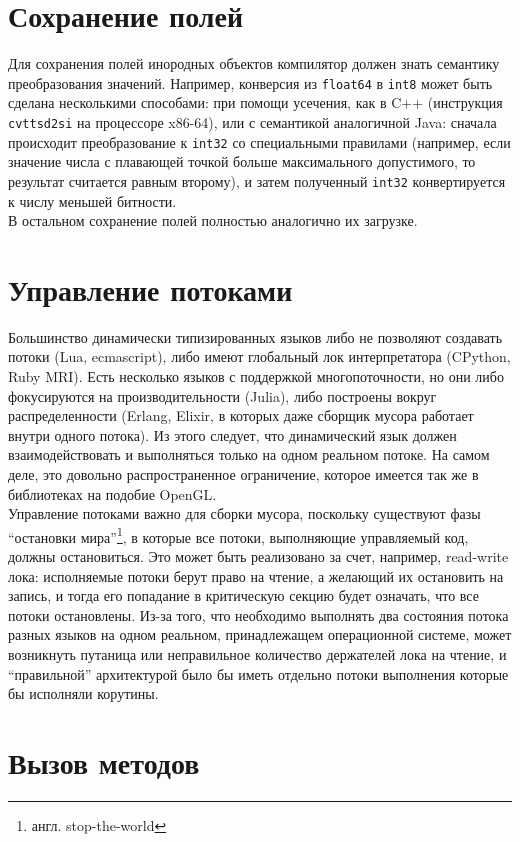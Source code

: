 \documentclass[times,specification,annotation]{itmo-student-thesis}
\begin{document}
\section{Сохранение полей}
Для сохранения полей инородных объектов компилятор должен знать семантику преобразования значений. Например, конверсия из \texttt{float64} в \texttt{int8} может быть сделана несколькими способами: при помощи усечения, как в C++ (инструкция \texttt{cvttsd2si} на процессоре x86-64), или с семантикой аналогичной Java: сначала происходит преобразование к \texttt{int32} со специальными правилами (например, если значение числа с плавающей точкой больше максимального допустимого, то результат считается равным второму), и затем полученный \texttt{int32} конвертируется к числу меньшей битности.\\
В остальном сохранение полей полностью аналогично их загрузке.

\section{Управление потоками} \label{sec:thread-management}
Большинство динамически типизированных языков либо не позволяют создавать потоки (Lua, ecmascript), либо имеют глобальный лок интерпретатора (CPython, Ruby MRI). Есть несколько языков с поддержкой многопоточности, но они либо фокусируются на производительности (Julia), либо построены вокруг распределенности (Erlang, Elixir, в которых даже сборщик мусора работает внутри одного потока). Из этого следует, что динамический язык должен взаимодействовать и выполняться только на одном реальном потоке. На самом деле, это довольно распространенное ограничение, которое имеется так же в библиотеках на подобие OpenGL.\\
Управление потоками важно для сборки мусора, поскольку существуют фазы ``остановки мира''\footnote{англ. stop-the-world}, в которые все потоки, выполняющие управляемый код, должны остановиться. Это может быть реализовано за счет, например, read-write лока: исполняемые потоки берут право на чтение, а желающий их остановить на запись, и тогда его попадание в критическую секцию будет означать, что все потоки остановлены. Из-за того, что необходимо выполнять два состояния потока разных языков на одном реальном, принадлежащем операционной системе, может возникнуть путаница или неправильное количество держателей лока на чтение, и ``правильной'' архитектурой было бы иметь отдельно потоки выполнения которые бы исполняли корутины.

\section{Вызов методов}
\end{document}

